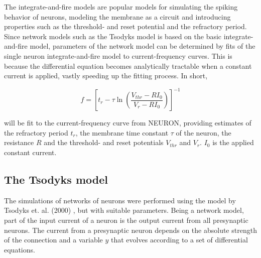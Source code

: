 \documentclass[twocolumn, a4paper,10pt, norsk]{scrartcl}
\begin{document}



The integrate-and-fire models are popular models for simulating the spiking behavior of neurons, modeling the membrane as a circuit and introducing properties such as the threshold- and reset potential and the refractory period\cite{i-and-f}. Since network models such as the Tsodyks model is based on the basic integrate-and-fire model\cite{Tsodyks}, parameters of the network model can be determined by fits of the single neuron integrate-and-fire model to current-frequency curves. This is because the differential equation becomes analytically tractable when a constant current is applied, vastly speeding up the fitting process. In short, 

\begin{equation}
 f = \left[ t_r - \tau\ln\left(\frac{V_{thr}-RI_0}{V_{r}-RI_0}\right) \right]^{-1}
 \label{eq:frequency}
\end{equation}

will be fit to the current-frequency curve from NEURON, providing estimates of the refractory period $t_r$, the membrane time constant $\tau$ of the neuron, the resistance $R$ and the threshold- and reset potentials $V_{thr}$ and $V_{r}$. $I_0$ is the applied constant current.

\subsection*{The Tsodyks model}
The simulations of networks of neurons were performed using the model by Tsodyks et. al. (2000) \cite{Tsodyks}, but with suitable parameters. Being a network model, part of the input current of a neuron is the output current from all presynaptic neurons. %
The current from a presynaptic neuron depends on the absolute strength of the connection and a variable $y$ that evolves according to a set of differential equations.
\end{document}
